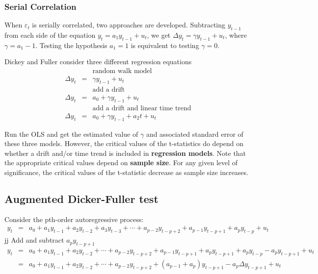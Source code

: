 \documentclass{article}
\begin{document}
\subsubsection{Serial Correlation}
When $\varepsilon_{t}$ is serially correlated, two approaches are developed. 
Subtracting $y_{t-1}$ from each side of the equation $y_{t}=a_{1}y_{t-1}+u_{t}$, we get $\Delta y_{t}=\gamma y_{t-1}+u_{t}$, where $\gamma=a_{1}-1$. Testing the hypothesis $a_{1}=1$ is equivalent to testing $\gamma=0$.

Dickey and Fuller consider three different regression equations 
\begin{eqnarray*}
&&\mbox{random walk model}\\
\Delta y_{t}&=&\gamma y_{t-1}+u_{t} \\
&&  \mbox{add a drift}\\
\Delta y_{t}&=&a_{0}+\gamma y_{t-1}+u_{t}\\
&&\mbox{add a drift and linear time trend}\\
\Delta y_{t}&=&a_{0}+\gamma y_{t-1}+a_{2}t+u_{t} 
\end{eqnarray*}

Run the OLS and get the estimated value of $\gamma$ and associated standard error of these three models. However, the critical values of the t-statistics do depend on whether a drift and/or time trend is included in \textbf{regression models}. Note that the appropriate critical values depend on \textbf{sample size}. For any given level of significance, the critical values of the t-statistic decrease as sample size increases. 

\subsection{Augmented Dicker-Fuller test}
Consider the pth-order autoregressive process:
\begin{eqnarray*}
y_{t}&=&a_{0}+a_{1}y_{t-1}+a_{2}y_{t-2}+a_{3}y_{t-3}+\cdots+a_{p-2}y_{t-p+2}+a_{p-1}y_{t-p+1}+a_{p}y_{t-p}+u_{t}
\end{eqnarray*}
jj
Add and subtract $a_{p}y_{t-p+1}$
\begin{eqnarray*}
y_{t}&=&a_{0}+a_{1}y_{t-1}+a_{2}y_{t-2}+\cdots+a_{p-2}y_{t-p+2}+a_{p-1}y_{t-p+1}+a_{p}y_{t-p+1}+a_{p}y_{t-p}-a_{p}y_{t-p+1}+u_{t}\\
	&=&a_{0}+a_{1}y_{t-1}+a_{2}y_{t-2}+\cdots+a_{p-2}y_{t-p+2}+(a_{p-1}+a_{p})y_{t-p+1}-a_{p}\Delta y_{t-p+1}+u_{t}
\end{eqnarray*}
\end{document}
